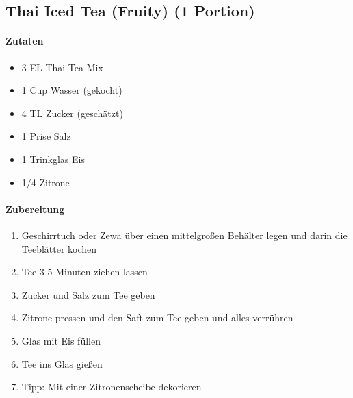 \newpage
\subsection{Thai Iced Tea (Fruity) (1 Portion)}
\paragraph{Zutaten}
\begin{itemize}[noitemsep]
	\item 3 EL Thai Tea Mix
	\item 1 Cup Wasser (gekocht)
	\item 4 TL Zucker (geschätzt)
	\item 1 Prise Salz
	\item 1 Trinkglas Eis
	\item 1/4 Zitrone
\end{itemize}
\paragraph{Zubereitung}
\begin{enumerate}[noitemsep]
	\item Geschirrtuch oder Zewa über einen mittelgroßen Behälter legen und darin die Teeblätter kochen
	\item Tee 3-5 Minuten ziehen lassen
	\item Zucker und Salz zum Tee geben
	\item Zitrone pressen und den Saft zum Tee geben und alles verrühren
	\item Glas mit Eis füllen
	\item Tee ins Glas gießen
	\item Tipp: Mit einer Zitronenscheibe dekorieren
\end{enumerate}
